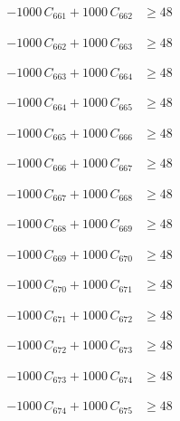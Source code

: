 \documentclass[a4paper,11pt]{article}
\begin{document}
\begin{align}
-1000\,C_{661} + 1000\,C_{662} &\geq 48 \nonumber
\end{align}

\begin{align}
-1000\,C_{662} + 1000\,C_{663} &\geq 48 \nonumber
\end{align}

\begin{align}
-1000\,C_{663} + 1000\,C_{664} &\geq 48 \nonumber
\end{align}

\begin{align}
-1000\,C_{664} + 1000\,C_{665} &\geq 48 \nonumber
\end{align}

\begin{align}
-1000\,C_{665} + 1000\,C_{666} &\geq 48 \nonumber
\end{align}

\begin{align}
-1000\,C_{666} + 1000\,C_{667} &\geq 48 \nonumber
\end{align}

\begin{align}
-1000\,C_{667} + 1000\,C_{668} &\geq 48 \nonumber
\end{align}

\begin{align}
-1000\,C_{668} + 1000\,C_{669} &\geq 48 \nonumber
\end{align}

\begin{align}
-1000\,C_{669} + 1000\,C_{670} &\geq 48 \nonumber
\end{align}

\begin{align}
-1000\,C_{670} + 1000\,C_{671} &\geq 48 \nonumber
\end{align}

\begin{align}
-1000\,C_{671} + 1000\,C_{672} &\geq 48 \nonumber
\end{align}

\begin{align}
-1000\,C_{672} + 1000\,C_{673} &\geq 48 \nonumber
\end{align}

\begin{align}
-1000\,C_{673} + 1000\,C_{674} &\geq 48 \nonumber
\end{align}

\begin{align}
-1000\,C_{674} + 1000\,C_{675} &\geq 48 \nonumber
\end{align}
\end{document}
